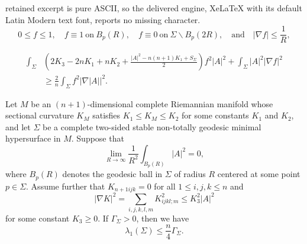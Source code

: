 \documentclass[10pt,a4paper]{amsart}
\begin{document}
retained excerpt is pure ASCII, so the delivered engine, XeLaTeX with its default Latin Modern text font, reports no missing character.
\begin{equation} \label{fd}
0\leq f\leq 1,\quad f\equiv 1~ \text{on}~ B_p(R),\quad f\equiv 0~\text{on}~\Sigma \backslash B_p(2R), \quad \text{and} \quad|\nabla f|\leq \frac{1}{R},
\end{equation}

\begin{align}\label{9}
\int_\Sigma &\left(2K_3-2nK_1+nK_2 +\frac{|A|^2-n(n+1)K_1+S_{\Sigma}}{2}\right) f^2|A|^2 +  \int_\Sigma |A|^2|\nabla f|^2 \nonumber\\
& \geq \frac{2}{n}\int_\Sigma f^2|\nabla |A||^2.
\end{align}

\begin{thm}\label{thmftc2}
Let $M$ be an $(n+1)$-dimensional complete Riemannian manifold whose sectional curvature $K_M$ satisfies $K_1\leq K_M\leq K_2$ for some constants $K_1$ and $K_2$, and let $\Sigma$ be a complete two-sided stable non-totally geodesic minimal hypersurface in $M$. Suppose that
$$
\lim_{R\to\infty}\frac{1}{R^2}\int_{B_p(R)}|A|^2=0,
$$
where $B_p(R)$ denotes the geodesic ball in $\Sigma$ of radius $R$ centered at some point $p\in\Sigma$. Assume further that $K_{n+1ijk}=0$ for all $1\leq i,j,k\leq n$ and 
$$
|\nabla K|^2=\sum_{i,j,k,l,m}K_{ijkl;m}^2\leq K_3^2|A|^2
$$
for some constant $K_3\geq 0$. If $\Gamma_{\Sigma}>0$, then we have
$$
\lambda_1(\Sigma)\leq \frac{n}{4}\Gamma_{\Sigma}.
$$
\end{thm}
\end{document}
